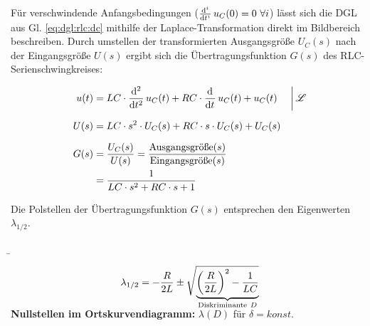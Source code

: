 \begin{frame}[t]
{    Für verschwindende Anfangsbedingungen ($\dt[i]\,u_C(0)=0\ \forall i$) lässt sich die DGL aus Gl. \ref{eq:dgl:rlc:dc}
    mithilfe der Laplace-Transformation direkt im Bildbereich beschreiben. Durch umstellen der transformierten Ausgangsgröße $U_C(s)$
    nach der Eingangsgröße $U(s)$ ergibt sich die Übertragungsfunktion $G(s)$ des RLC-Serienschwingkreises:

    \begin{align}
        u(t) &= LC \cdot \dt[2]\,u_{C}(t) + RC \cdot \dt\,u_{C}(t) + u_{C}(t)& &\bigg|\,\mathscr{L}\\
        U(s) &= LC \cdot s^2 \cdot U_C(s) + RC \cdot s \cdot U_C(s) + U_C(s) \vphantom{\bigg|}\\
        G(s) &= \frac{U_C(s)}{U(s)} = \frac{\text{Ausgangsgröße}(s)}{\text{Eingangsgröße}(s)} \vphantom{\bigg|}\\
        &= \frac{1}{LC \cdot s^2 + RC \cdot s + 1}
    \end{align}

    Die Polstellen der Übertragungsfunktion $G(s)$ entsprechen den Eigenwerten $\lambda_{1/2}$.

}%
\b{%
\begin{minipage}{\textwidth}\centering
    \begin{minipage}[t][3cm][]{0.48\textwidth}\centering
    \end{minipage}%
    \begin{minipage}[t][3cm][]{0.48\textwidth}\centering
    \begin{align*}
        \lambda_{1/2} = -\frac{R}{2L} \pm \sqrt{
            \smash{\underbrace{%
            \left(\frac{R}{2L}\right)^2 - \frac{1}{LC}
            }_{\mathclap{\text{Diskriminante}\ D}}}
            \vphantom{\left(\frac{R}{2L}\right)^2 - \frac{1}{LC}}%
        }%
    \end{align*}
    \end{minipage}
\end{minipage}\vspace{2pt}

\textbf{Nullstellen im Ortskurvendiagramm:} $\lambda(D)$ für $\delta=konst.$ \vspace{2pt}

}
\end{frame}
